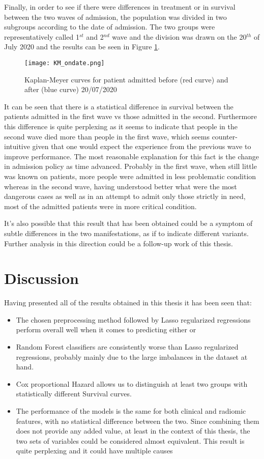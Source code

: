 Finally, in order to see if there were differences in treatment or in survival between the two waves of admission, the population was divided in two subgroups according to the date of admission. 
The two groups were representatively called 1$^{st}$ and 2$^{nd}$ wave and the division was drawn on the 20$^{th}$ of July 2020 and the results can be seen in Figure \ref{fig:kmwaves}.

\begin{figure}
\texttt{[image: KM\_ondate.png]}
\caption{Kaplan-Meyer curves for patient admitted before (red curve) and after (blue curve) 20/07/2020 \label{fig:kmwaves}}
\end{figure}

It can be seen that there is a statistical difference in survival between the patients admitted in the first wave vs those admitted in the second. 
Furthermore this difference is quite perplexing as it seems to indicate that people in the second wave died more than people in the first wave, which seems counter-intuitive given that one would expect the experience from the previous wave to improve performance.
The most reasonable explanation for this fact is the change in admission policy as time advanced.
Probably in the first wave, when still little was known on \covid patients, more people were admitted in less problematic condition whereas in the second wave, having understood better what were the most dangerous cases as well as in an attempt to admit only those  strictly in need, most of the admitted patients were in more critical condition.

It's also possible that this result that has been obtained could be a symptom of subtle differences in the two \covid manifestations, as if to indicate different variants.
Further analysis in this direction could be a follow-up work of this thesis.

\chapter{Discussion}
Having presented all of the results obtained in this thesis it has been seen that:

\begin{itemize}
\item The chosen preprocessing method followed by Lasso regularized regressions perform overall well when it comes to predicting either \death or \icu
\item Random Forest classifiers are consistently worse than Lasso regularized regressions, probably mainly due to the large imbalances in the dataset at hand.
\item Cox proportional Hazard allows us to distinguish at least two groups with statistically different Survival curves.
\item The performance of the models is the same for both clinical and radiomic features, with no statistical difference between the two. Since combining them does not provide any added value, at least in the context of this thesis, the two sets of variables could be considered almost equivalent.
This result is quite perplexing and it could have multiple causes
\end{itemize}

